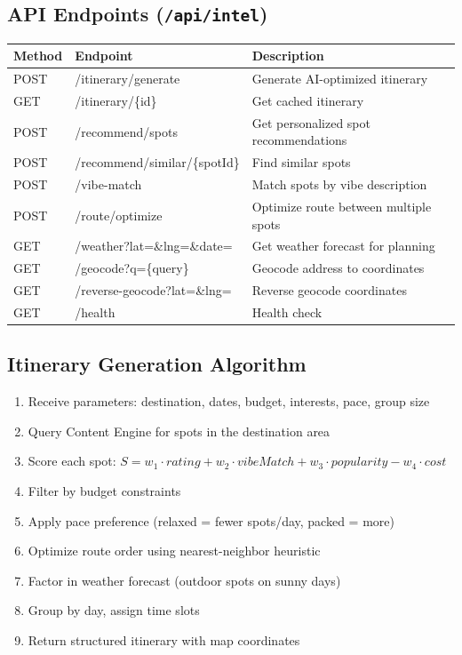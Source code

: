 \documentclass[12pt,letterpaper]{article}
\begin{document}
\subsection{API Endpoints (\texttt{/api/intel})}
\begin{tabular}{|l|l|l|}
\hline
\textbf{Method} & \textbf{Endpoint} & \textbf{Description} \\
\hline
POST & /itinerary/generate & Generate AI-optimized itinerary \\
GET  & /itinerary/\{id\} & Get cached itinerary \\
POST & /recommend/spots & Get personalized spot recommendations \\
POST & /recommend/similar/\{spotId\} & Find similar spots \\
POST & /vibe-match & Match spots by vibe description \\
POST & /route/optimize & Optimize route between multiple spots \\
GET  & /weather?lat=\&lng=\&date= & Get weather forecast for planning \\
GET  & /geocode?q=\{query\} & Geocode address to coordinates \\
GET  & /reverse-geocode?lat=\&lng= & Reverse geocode coordinates \\
GET  & /health & Health check \\
\hline
\end{tabular}

\subsection{Itinerary Generation Algorithm}
\begin{enumerate}
  \item Receive parameters: destination, dates, budget, interests, pace, group size
  \item Query Content Engine for spots in the destination area
  \item Score each spot: $S = w_1 \cdot rating + w_2 \cdot vibeMatch + w_3 \cdot popularity - w_4 \cdot cost$
  \item Filter by budget constraints
  \item Apply pace preference (relaxed = fewer spots/day, packed = more)
  \item Optimize route order using nearest-neighbor heuristic
  \item Factor in weather forecast (outdoor spots on sunny days)
  \item Group by day, assign time slots
  \item Return structured itinerary with map coordinates
\end{enumerate}
\end{document}
